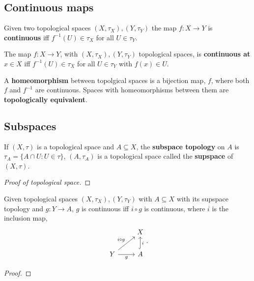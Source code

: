 \documentclass[../Year2.tex]{subfiles}
\begin{document}
\subsection{Continuous maps}

\begin{definition}
    Given two topological spaces $(X,\tau_X),(Y,\tau_Y)$ the map $f:X\rightarrow Y$ is \textbf{continuous} iff $f^{-1}(U)\in\tau_X$ for all $U\in\tau_Y$.
\end{definition}

\begin{definition}
    The map $f:X\rightarrow Y$, with $(X,\tau_X),(Y,\tau_Y)$ topological spaces, is \textbf{continuous at} $x\in X$ iff $f^{-1}(U)\in\tau_X$ for all $U\in\tau_Y$ with $f(x)\in U$.
\end{definition}

\begin{definition}[Homeomorphism]
    A \textbf{homeomorphism} between topolgical spaces is a bijection map, $f$, where both $f$ and $f^{-1}$ are continuous. Spaces with homeomorphisms between them are \textbf{topologically equivalent}.
\end{definition}

\subsection{Subspaces}

\begin{definition}[Subspace]
    If $(X,\tau)$ is a topological space and $A\subseteq X$, the \textbf{subspace topology} on $A$ is $\tau_A=\{A\cap U: U\in\tau\}$, $(A,\tau_A)$ is a topological space called the \textbf{supspace} of $(X,\tau)$.
    \begin{proof}[Proof of topological space]
        
    \end{proof}
\end{definition}

\begin{proposition}
    Given topological spaces $(X,\tau_X), (Y,\tau_Y)$ with $A\subseteq X$ with its supspace topology and $g:Y\rightarrow A$, $g$ is continuous iff $i\circ g$ is continuous, where $i$ is the inclusion map, \[
        \begin{tikzcd}
            & X \\
            Y \arrow[ur, "i\circ g"] \arrow[r, swap, "g"] & A \arrow[u, swap, hook, "i"]
        \end{tikzcd}
        \black{.}
    \]
    \begin{proof}
        
    \end{proof}
\end{proposition}
\end{document}
